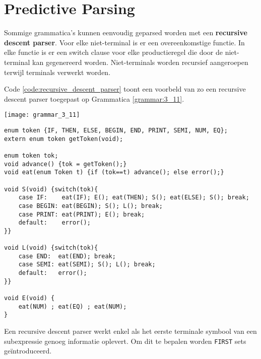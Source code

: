 \section{Predictive Parsing}
Sommige grammatica's kunnen eenvoudig geparsed worden met een \textbf{recursive descent parser}. Voor elke niet-terminal is er een overeenkomstige functie. In elke functie is er een switch clause voor elke productieregel die door de niet-terminal kan gegenereerd worden. Niet-terminals worden recursief aangeroepen terwijl terminals verwerkt worden.

Code \ref{code:recursive_descent_parser} toont een voorbeld van zo een recursive descent parser toegepast op Grammatica \ref{grammar:3_11}.

\begin{grammarfigure}
	\texttt{[image: grammar\_3\_11]}
	\caption{}
	\label{grammar:3_11}
\end{grammarfigure}

\begin{lstlisting}[caption={Een recursive descent parser gebaseerd op Grammatica \ref{grammar:3_11}},label={code:recursive_descent_parser},captionpos=b]
enum token {IF, THEN, ELSE, BEGIN, END, PRINT, SEMI, NUM, EQ};
extern enum token getToken(void);

enum token tok;
void advance() {tok = getToken();}
void eat(enum Token t) {if (tok==t) advance(); else error();}

void S(void) {switch(tok){
	case IF:    eat(IF); E(); eat(THEN); S(); eat(ELSE); S(); break;
	case BEGIN: eat(BEGIN); S(); L(); break;
	case PRINT: eat(PRINT); E(); break;
	default:    error();
}}
	
void L(void) {switch(tok){
	case END:  eat(END); break;
	case SEMI: eat(SEMI); S(); L(); break;
	default:   error();
}}

void E(void) {
	eat(NUM) ; eat(EQ) ; eat(NUM);
}
\end{lstlisting}

Een recursive descent parser werkt enkel als het eerste terminale symbool van een subexpressie genoeg informatie oplevert. Om dit te bepalen worden \texttt{FIRST} sets geïntroduceerd.

